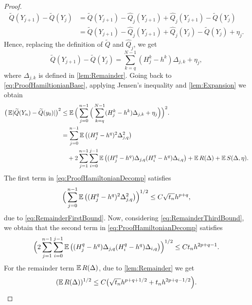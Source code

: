 \documentclass[10pt]{article}
\begin{document}
{\begin{proof}
	\begin{equation}
	\begin{aligned}
	\tilde Q(Y_{j+1}) - \tilde Q(Y_j) &= \tilde Q(Y_{j+1}) - \hat Q_j(Y_{j+1}) + \hat Q_j(Y_{j+1}) - \tilde Q(Y_j) \\
	&= \tilde Q(Y_{j+1}) - \hat Q_j(Y_{j+1}) + \hat Q_j(Y_j) - \tilde Q(Y_j) + \eta_j.
	\end{aligned}
	\end{equation}
	Hence, replacing the definition of $\tilde Q$ and $\hat Q_j$, we get
	\begin{equation}
	\tilde Q(Y_{j+1}) - \tilde Q(Y_j) = \sum_{k=q}^{N-1} (H_j^k - h^k)\Delta_{j,k} + \eta_j,
	\end{equation}
	where $\Delta_{j,k}$ is defined in \cref{lem:Remainder}.	Going back to \eqref{eq:ProofHamiltionianBase}, applying Jensen's inequality and \cref{lem:Expansion} we obtain
	\begin{equation}\label{eq:ProofHamiltonianDecomp}
	\begin{aligned}
	\big(\operatorname{\mathbb{E}} \lvert\widetilde Q(Y_n) - \widetilde Q(y_0)\rvert\big)^2 &\leq \operatorname{\mathbb{E}} \Big(\sum_{j=0}^{n-1} \Big(\sum_{k=q}^{N-1}(H_j^k - h^k)\Delta_{j,k} + \eta_j \Big) \Big)^2. \\
	&= \sum_{j=0}^{n-1}\operatorname{\mathbb{E}}\big((H_j^q - h^q)^2 \Delta_{j,q}^2\big) \\
	&\quad + 2\sum_{j=1}^{n-1}\sum_{i=0}^{j-1} \operatorname{\mathbb{E}}\big((H_j^q - h^q)\Delta_{j,q}(H_i^q - h^q) \Delta_{i,q}\big) + \operatorname{\mathbb{E}} R(\Delta) + \operatorname{\mathbb{E}} S(\Delta, \eta).
	\end{aligned}
	\end{equation}
	The first term in \eqref{eq:ProofHamiltonianDecomp} satisfies
	\begin{equation}\label{eq:BoundFirstTerm}
		\Big(\sum_{j=0}^{n-1}\operatorname{\mathbb{E}}\big((H_j^q - h^q)^2 \Delta_{j,q}^2\big)\Big)^{1/2} \leq C \sqrt{t_n} h^{p+q},
	\end{equation}
	due to \eqref{eq:RemainderFirstBound}. Now, considering \eqref{eq:RemainderThirdBound}, we obtain that the second term in \eqref{eq:ProofHamiltonianDecomp} satisfies
	\begin{equation}
		\Big(2\sum_{j=1}^{n-1}\sum_{i=0}^{j-1} \operatorname{\mathbb{E}}\big((H_j^q - h^q)\Delta_{j,q}(H_i^q - h^q) \Delta_{i,q}\big)\Big)^{1/2} \leq  C t_n h^{2p+q-1}.
	\end{equation}
	For the remainder term $\operatorname{\mathbb{E}} R(\Delta)$, due to \cref{lem:Remainder} we get
	\begin{equation}
		(\operatorname{\mathbb{E}} R(\Delta))^{1/2} \leq C \big(\sqrt{t_n} h^{p + q + 1/2} + t_n h^{2p + q - 1/2}\Big).
	\end{equation}

\end{proof}}
\end{document}
